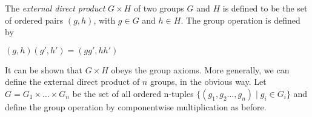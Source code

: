 \documentclass{article}
\begin{document}
The \emph{external direct product} $G \times H$ of two groups $G$ and $H$ is defined to be the set of ordered pairs $(g,h)$, with $g\in G$ and $h\in H$. The group operation is defined by

$(g,h)(g',h') = (gg', hh')$

It can be shown that $G \times H$ obeys the group axioms. More generally, we can define the external direct product of $n$ groups, in the obvious way. Let $G = G_1 \times \ldots \times G_n$ be the set of all ordered n-tuples $\{(g_1, g_2 \ldots ,g_n) \mid g_i \in G_i\}$ and define the group operation by componentwise multiplication as before.
\end{document}
